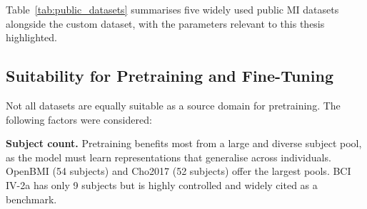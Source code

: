 \documentclass[english, bc, kiv, he, iso690alph, pdf]{fasthesis}
\begin{document}
Table~\ref{tab:public_datasets} summarises five widely used public MI datasets alongside the custom dataset, with the parameters relevant to this thesis highlighted.

\begin{table}[ht]
    \centering
    \caption{Comparison of public motor imagery EEG datasets. MOABB column indicates availability via the MOABB framework. Trials/class are approximate per-subject values for left/right hand classes only.}
    \label{tab:public_datasets}
\end{table}

\subsection{Suitability for Pretraining and Fine-Tuning}

Not all datasets are equally suitable as a source domain for pretraining. The following factors were considered:

\textbf{Subject count.} Pretraining benefits most from a large and diverse subject pool, as the model must learn representations that generalise across individuals. OpenBMI (54 subjects) and Cho2017 (52 subjects) offer the largest pools. BCI IV-2a has only 9 subjects but is highly controlled and widely cited as a benchmark.
\end{document}

